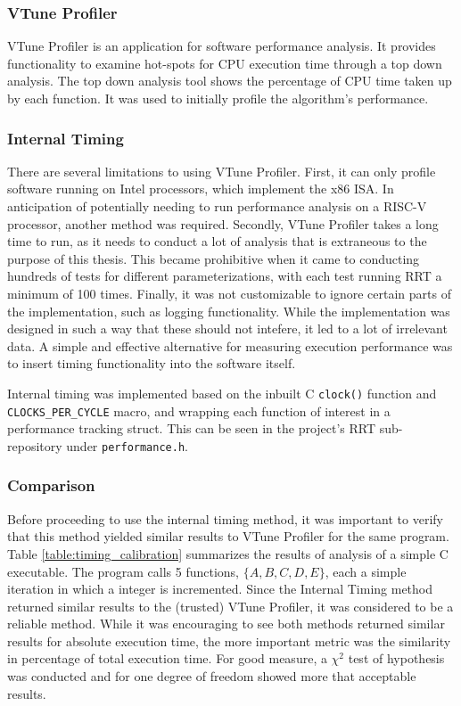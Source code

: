 
\subsubsection*{VTune Profiler}
    VTune Profiler is an application for software performance analysis. It provides functionality to examine hot-spots for CPU execution time through a top down analysis. The top down analysis tool shows the percentage of CPU time taken up by each function. It was used to initially profile the algorithm's performance.

    \subsubsection{Internal Timing}
        There are several limitations to using VTune Profiler. First, it can only profile software running on Intel processors, which implement the x86 \gls{ISA}. In anticipation of potentially needing to run performance analysis on a \gls{RISC-V} processor, another method was required. Secondly, VTune Profiler takes a long time to run, as it needs to conduct a lot of analysis that is extraneous to the purpose of this thesis. This became prohibitive when it came to conducting hundreds of tests for different parameterizations, with each test running \gls{RRT} a minimum of 100 times. Finally, it was not customizable to ignore certain parts of the implementation, such as logging functionality. While the implementation was designed in such a way that these should not intefere, it led to a lot of irrelevant data. A simple and effective alternative for measuring execution performance was to insert timing functionality into the software itself.

        Internal timing was implemented based on the inbuilt C \texttt{clock()} function and \\ \texttt{CLOCKS\_PER\_CYCLE} macro, and wrapping each function of interest in a performance tracking struct. This can be seen in the project's \gls{RRT} sub-repository under \texttt{performance.h}.

    \subsubsection*{Comparison}
        Before proceeding to use the internal timing method, it was important to verify that this method yielded similar results to VTune Profiler for the same program. Table \ref{table:timing_calibration} summarizes the results of analysis of a simple C executable. The program calls 5 functions, $\{A, B, C, D, E\}$, each a simple iteration in which a integer is incremented. Since the Internal Timing method returned similar results to the (trusted) VTune Profiler, it was considered to be a reliable method. While it was encouraging to see both methods returned similar results for absolute execution time, the more important metric was the similarity in percentage of total execution time. For good measure, a $\chi^2$ test of hypothesis was conducted and for one degree of freedom showed more that acceptable results.

